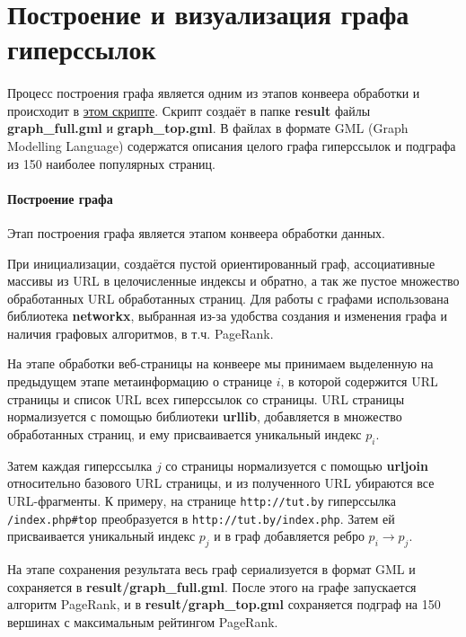 \section{Построение и визуализация графа гиперссылок}
\paragraph{}
Процесс построения графа является одним из этапов конвеера обработки и происходит в \href{https://github.com/vasalf/hse-web-search-homework/blob/master/1/pipeline/graph_builder.py}{этом скрипте}. Скрипт создаёт в папке \textbf{result} файлы \textbf{graph\_full.gml} и \textbf{graph\_top.gml}. В файлах в формате GML (Graph Modelling Language) содержатся описания целого графа гиперссылок и подграфа из 150 наиболее популярных страниц.
\paragraph{Построение графа}

Этап построения графа является этапом конвеера обработки данных.

 При инициализации, создаётся пустой ориентированный граф, ассоциативные массивы из URL в целочисленные индексы и обратно, а так же пустое множество обработанных URL обработанных страниц. Для работы с графами использована библиотека \textbf{networkx}, выбранная из-за удобства создания и изменения графа и наличия графовых алгоритмов, в т.ч. PageRank.
 
 На этапе обработки веб-страницы на конвеере мы принимаем выделенную на предыдущем этапе метаинформацию о странице $i$, в которой содержится URL страницы и список URL всех гиперссылок со страницы. URL страницы нормализуется с помощью библиотеки \textbf{urllib}, добавляется в множество обработанных страниц, и ему присваивается уникальный индекс $p_i$. 
 
 Затем каждая гиперссылка $j$ со страницы нормализуется с помощью \textbf{urljoin} относительно базового URL страницы, и из полученного URL убираются все URL-фрагменты. К примеру, на странице \texttt{http://tut.by} гиперссылка \texttt{/index.php\#top} преобразуется в  \texttt{http://tut.by/index.php}. Затем ей присваивается уникальный индекс $p_j$ и в граф добавляется ребро $p_i \rightarrow p_j$.
 
 На этапе сохранения результата весь граф сериализуется в формат GML и сохраняется в \textbf{result/graph\_full.gml}. После этого на графе запускается алгоритм PageRank, и  в \textbf{result/graph\_top.gml} сохраняется подграф на 150 вершинах с максимальным рейтингом PageRank.